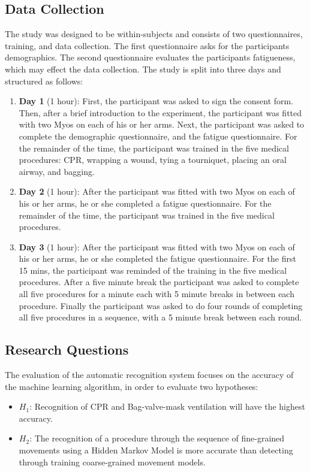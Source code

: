 \subsection{Data Collection}
\label{sec:Experimental-Design:Data-Collection}
The study was designed to be within-subjects and consists of two questionnaires, training, and data collection. The first questionnaire asks for the participants demographics. The second questionnaire evaluates the participants fatigueness, which may effect the data collection. The study is split into three days and structured as follows:
\begin{enumerate}
	\item \textbf{Day 1} (1 hour): First, the participant was asked to sign the consent form. Then, after a brief introduction to the experiment, the participant was fitted with two Myos on each of his or her arms. Next, the participant was asked to complete the demographic questionnaire, and the fatigue questionnaire. For the remainder of the time, the participant was trained in the five medical procedures: CPR, wrapping a wound, tying a tourniquet, placing an oral airway, and bagging.
	\item \textbf{Day 2} (1 hour): After the participant was fitted with two Myos on each of his or her arms, he or she completed a fatigue questionnaire. For the remainder of the time, the participant was trained in the five medical procedures.
	\item \textbf{Day 3} (1 hour): After the participant was fitted with two Myos on each of his or her arms, he or she completed the fatigue questionnaire. For the first 15 mins, the participant was reminded of the training in the five medical procedures.
	After a five minute break the participant was asked to complete all five procedures for a minute each with 5 minute breaks in between each procedure. Finally the participant was asked to do four rounds of completing all five procedures in a sequence, with a 5 minute break between each round.
\end{enumerate}

\subsection{Research Questions}
\label{sec:Data-Collection:Research-Questions}
The evaluation of the automatic recognition system focuses on the accuracy of the machine learning algorithm, in order to evaluate two hypotheses:
\begin{itemize}
	\item $H_1$: Recognition of CPR and Bag-valve-mask ventilation will have the highest accuracy.
	\item $H_2$: The recognition of a procedure through the sequence of fine-grained movements using a Hidden Markov Model is more accurate than detecting through training coarse-grained movement models.
\end{itemize}

